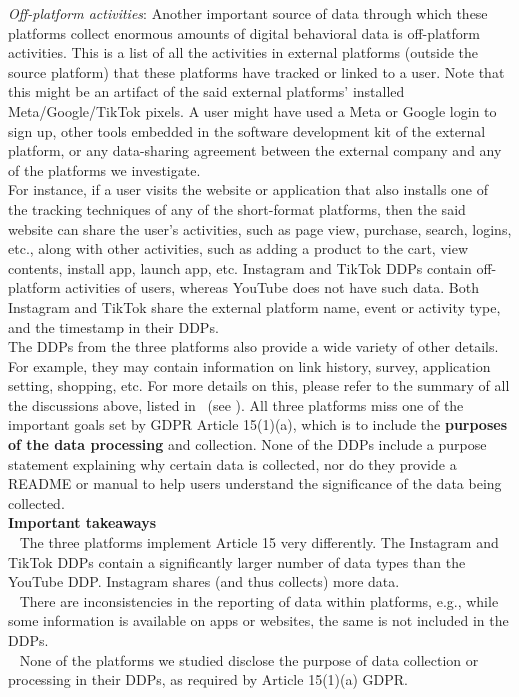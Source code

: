 \noindent
\textit{Off-platform activities}: Another important source of data through which these platforms collect enormous amounts of digital behavioral data is off-platform activities.
This is a list of all the activities in external platforms (outside the source platform) that these platforms have tracked or linked to a user.
Note that this might be an artifact of the said external platforms' installed Meta/Google/TikTok pixels.
A user might have used a Meta or Google login to sign up, other tools embedded in the software development kit of the external platform, or any data-sharing agreement between the external company and any of the platforms we investigate.\\
For instance, if a user visits the website or application that also installs one of the tracking techniques of any of the short-format platforms, then the said website can share the user's activities, such as page view, purchase, search, logins, etc., along with other activities, such as adding a product to the cart, view contents, install app, launch app, etc.
Instagram and TikTok DDPs contain off-platform activities of users, whereas YouTube does not have such data.
Both Instagram and TikTok share the external platform name, event or activity type, and the timestamp in their DDPs.\\
The DDPs from the three platforms also provide a wide variety of other details.
For example, they may contain information on link history, survey, application setting, shopping, etc.
For more details on this, please refer to the summary of all the discussions above, listed in~ (see ).
All three platforms miss one of the important goals set by GDPR Article 15(1)(a), which is to include the \textbf{purposes of the data processing} and collection.
None of the DDPs include a purpose statement explaining why certain data is collected, nor do they provide a README or manual to help users understand the significance of the data being collected.\\%
\noindent
\textbf{Important takeaways}\\ %
\noindent
\faHandPointRight~ The three platforms implement Article 15 very differently. The Instagram and TikTok DDPs contain a significantly larger number of data types than the YouTube DDP. Instagram shares (and thus collects) more data.\\
\noindent
\faHandPointRight~ There are inconsistencies in the reporting of data within platforms, e.g., while some information is available on apps or websites, the same is not included in the DDPs.\\
\noindent
\faHandPointRight~ None of the platforms we studied disclose the purpose of data collection or processing in their DDPs, as required by Article 15(1)(a) GDPR.